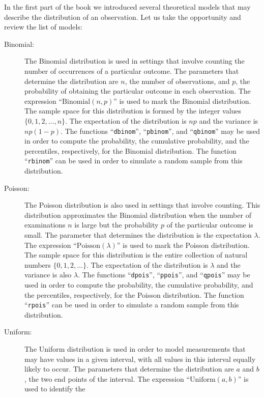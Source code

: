 \documentclass[
]{krantz}
\theoremstyle{definition}
\theoremstyle{definition}
\theoremstyle{definition}
\theoremstyle{remark}
\begin{document}
In the first part of the book we introduced several theoretical models
that may describe the distribution of an observation. Let us take the
opportunity and review the list of models:

\begin{description}
\item[Binomial:]
The Binomial distribution is used in settings that involve counting
the number of occurrences of a particular outcome. The parameters
that determine the distribution are \(n\), the number of observations,
and \(p\), the probability of obtaining the particular outcome in each
observation. The expression ``\(\mathrm{Binomial}(n,p)\)'' is used to
mark the Binomial distribution. The sample space for this
distribution is formed by the integer values
\(\{0, 1, 2, \ldots, n\}\). The expectation of the distribution is
\(np\) and the variance is \(np(1-p)\). The functions ``\texttt{dbinom}'',
``\texttt{pbinom}'', and ``\texttt{qbinom}'' may be used in order to compute the
probability, the cumulative probability, and the percentiles,
respectively, for the Binomial distribution. The function ``\texttt{rbinom}''
can be used in order to simulate a random sample from this
distribution.
\item[Poisson:]
The Poisson distribution is also used in settings that involve
counting. This distribution approximates the Binomial distribution
when the number of examinations \(n\) is large but the probability \(p\)
of the particular outcome is small. The parameter that determines
the distribution is the expectation \(\lambda\). The expression
``\(\mathrm{Poisson}(\lambda)\)'' is used to mark the Poisson
distribution. The sample space for this distribution is the entire
collection of natural numbers \(\{0, 1, 2, \ldots\}\). The expectation
of the distribution is \(\lambda\) and the variance is also \(\lambda\).
The functions ``\texttt{dpois}'', ``\texttt{ppois}'', and ``\texttt{qpois}'' may be used in
order to compute the probability, the cumulative probability, and
the percentiles, respectively, for the Poisson distribution. The
function ``\texttt{rpois}'' can be used in order to simulate a random sample
from this distribution.
\item[Uniform:]
The Uniform distribution is used in order to model measurements that
may have values in a given interval, with all values in this
interval equally likely to occur. The parameters that determine the
distribution are \(a\) and \(b\), the two end points of the interval.
The expression ``\(\mathrm{Uniform}(a,b)\)'' is used to identify the

\end{description}
\end{document}
